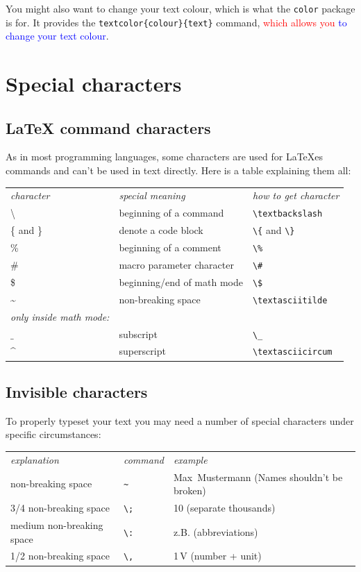 \documentclass[	%
		fontsize=11pt,  %
		a4paper,	    %
		english,		%
		sans,			%
		f1,				%
	]{HsH-report}		%
\begin{document}
		\medskip
		You might also want to change your text colour, which is what the \lstinline{color} package is for. It provides the
		\lstinline|textcolor{colour}{text}| command, \textcolor{red}{which allows you} \textcolor{blue}{to change your text colour}.

	\pagebreak
	\section{Special characters} \label{sec: special-charaters}

		\subsection{LaTeX command characters}
			As in most programming languages, some characters are used for LaTeXes commands and can't be used in text directly. Here is a table
			explaining them all:

			\smallskip
			\begin{tabular}{l l l}
				\emph{character} & \emph{special meaning} & \emph{how to get character} \\
				\textbackslash & beginning of a command & \lstinline|\textbackslash| \\
				\{ and \} & denote a code block & \lstinline|\{| and \lstinline|\}|\\
				\% & beginning of a comment & \lstinline|\%| \\
				\# & macro parameter character & \lstinline|\#| \\
				\$ & beginning/end of math mode & \lstinline|\$| \\
				\textasciitilde & non-breaking space & \lstinline|\textasciitilde| \\
				\emph{only inside math mode:} \\
				$\_$ & subscript & \lstinline|\_| \\
				\textasciicircum & superscript & \lstinline|\textasciicircum| \\
			\end{tabular}

		\subsection{Invisible characters}
			To properly typeset your text you may need a number of special characters under specific circumstances:

			\smallskip
			\begin{tabular}{l l l}
				\emph{explanation} & \emph{command} & \emph{example} \\
				non-breaking space & \lstinline|~| & Max~Mustermann (Names shouldn't be broken) \\
				3/4 non-breaking space & \lstinline|\;| & 10\;000 (separate thousands)\\
				medium non-breaking space & \lstinline|\:| & z.\:B. (abbreviations) \\
				1/2 non-breaking space & \lstinline|\,| & 1\,V (number + unit) \\
			\end{tabular}
\end{document}
